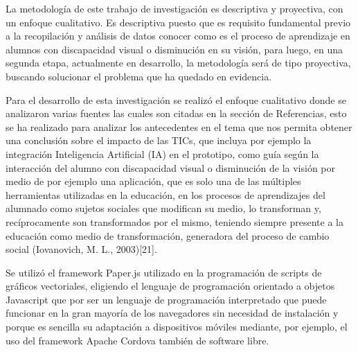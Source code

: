 \documentclass{article}
\begin{document}
{\changefontsizes{8.8pt}
La metodología de este trabajo de investigación es descriptiva y proyectiva, con un enfoque cualitativo. Es descriptiva puesto que es requisito fundamental previo a la recopilación y análisis de datos conocer como es el proceso de aprendizaje en alumnos con discapacidad visual o disminución en su visión, para luego, en una segunda etapa, actualmente en desarrollo, la metodología será de tipo proyectiva, buscando solucionar el problema que ha quedado en evidencia.

Para el desarrollo de esta investigación se realizó el enfoque cualitativo donde se analizaron varias fuentes las cuales son citadas en la sección de Referencias, esto se ha realizado para analizar los antecedentes en el tema que nos permita obtener una conclusión sobre el impacto de las TICs, que incluya por ejemplo la integración Inteligencia Artificial (IA) en el prototipo, como guía según la interacción del alumno con discapacidad visual o disminución de la visión por medio de por ejemplo una aplicación, que es solo una de las múltiples herramientas utilizadas en la educación, en los procesos de aprendizajes del alumnado como sujetos sociales que modifican su medio, lo transforman y, recíprocamente son transformados por el mismo, teniendo siempre presente a la educación como medio de transformación, generadora del proceso de cambio social (Iovanovich, M. L., 2003)[21].

Se utilizó el framework Paper.js utilizado en la programación de scripts de gráficos vectoriales, eligiendo el lenguaje de programación orientado a objetos Javascript que por ser un lenguaje de programación interpretado que puede funcionar en la gran mayoría de los navegadores sin necesidad de instalación y porque es sencilla su adaptación a dispositivos móviles mediante, por ejemplo, el uso del framework Apache Cordova también de software libre.
}
\end{document}
